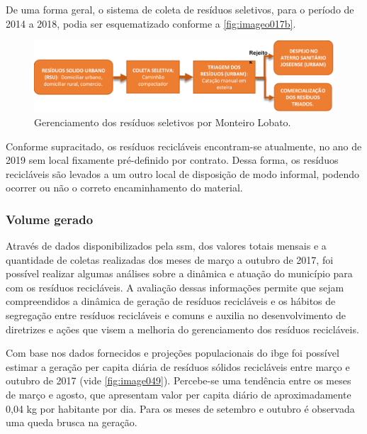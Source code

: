 De uma forma geral, o sistema de coleta de resíduos seletivos, para o período de 2014 a 2018, podia ser esquematizado conforme a \autoref{fig:imageo017b}.

\begin{figure}
	\centering
	\includegraphics[width=0.75\linewidth]{produtos/prodtres/image017b}
	\caption{Gerenciamento dos resíduos seletivos por Monteiro Lobato.}
	\label{fig:image017b}
\end{figure}

Conforme supracitado, os resíduos recicláveis encontram-se atualmente, no ano de 2019 sem local fixamente pré-definido por contrato. Dessa forma, os resíduos recicláveis são levados a um outro local de disposição de modo informal, podendo ocorrer ou não o correto encaminhamento do material.

\subsubsection{Volume gerado}

Através de dados disponibilizados pela \gls{ssm}, dos valores totais mensais e a quantidade de coletas realizadas dos meses de março a outubro de 2017, foi possível realizar algumas análises sobre a dinâmica e atuação do município para com os resíduos recicláveis. A avaliação dessas informações permite que sejam compreendidos a dinâmica de geração de resíduos recicláveis e os hábitos de segregação entre resíduos recicláveis e comuns e auxilia no desenvolvimento de diretrizes e ações que visem a melhoria do gerenciamento dos resíduos recicláveis.

Com base nos dados fornecidos e projeções populacionais do \gls{ibge} foi possível estimar a geração per capita diária de resíduos sólidos recicláveis entre março e outubro de 2017 (vide \autoref{fig:image049}). Percebe-se uma tendência entre os meses de março e agosto, que apresentam valor per capita diário de aproximadamente 0,04 kg por habitante por dia. Para os meses de setembro e outubro é observada uma queda brusca na geração.

